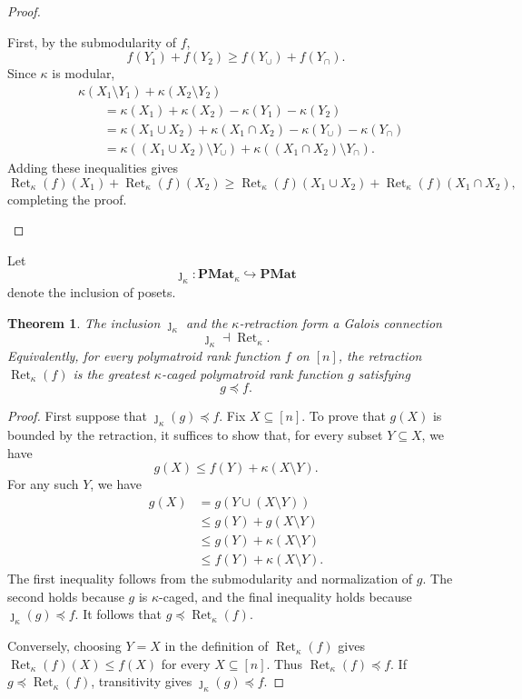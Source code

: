\documentclass[10pt,a4paper]{amsart}
\newtheorem{theorem}{Theorem}[section]
\newcommand{\PMat}{\mathbf{PMat}}      %
\newcommand{\PMatK}{\mathbf{PMat}_\kappa}
\DeclareMathOperator{\Ret}{Ret}                %
\newcommand{\RetK}{\Ret_{\kappa}}              %
\begin{document}
\begin{proof}
\begin{itemize}
        First, by the submodularity of $f$,
        \[
            f(Y_1)+f(Y_2)
            \geq
            f(Y_{\cup})+f(Y_{\cap}).
        \]
        Since $\kappa$ is modular,
        \begin{align*}
            &\kappa(X_1\setminus Y_1)+\kappa(X_2\setminus Y_2)\\
            &\qquad=
            \kappa(X_1)+\kappa(X_2)-\kappa(Y_1)-\kappa(Y_2)\\
            &\qquad=
            \kappa(X_1\cup X_2)+\kappa(X_1\cap X_2)
            -\kappa(Y_\cup)-\kappa(Y_\cap)\\
            &\qquad=
            \kappa((X_1\cup X_2)\setminus Y_\cup)
            +
            \kappa((X_1\cap X_2)\setminus Y_\cap).
        \end{align*}
        Adding these inequalities gives
        \[
            \RetK(f)(X_1)+\RetK(f)(X_2)
            \geq
            \RetK(f)(X_1\cup X_2)+\RetK(f)(X_1\cap X_2),
        \]
        completing the proof.
    \end{itemize}
\end{proof}

Let
\[
    \jmath_\kappa\colon\PMatK\hookrightarrow\PMat
\]
denote the inclusion of posets.

\begin{theorem}\label{thm:rank_retraction_galois}
    The inclusion $\jmath_\kappa$ and the $\kappa$-retraction form a Galois
    connection
    \[
        \jmath_\kappa\dashv\RetK.
    \]
    Equivalently, for every polymatroid rank function $f$ on $[n]$, the
    retraction $\RetK(f)$ is the greatest $\kappa$-caged polymatroid rank
    function $g$ satisfying
    \[
        g\preceq f.
    \]
\end{theorem}

\begin{proof}
    First suppose that $\jmath_\kappa(g)\preceq f$. Fix
    $X\subseteq[n]$. To prove that $g(X)$ is bounded by the retraction, it
    suffices to show that, for every subset $Y\subseteq X$, we have
    \[
        g(X)\leq f(Y)+\kappa(X\setminus Y).
    \]
    For any such $Y$, we have
    \begin{align*}
        g(X)
        &=g(Y\cup(X\setminus Y))\\
        &\leq g(Y)+g(X\setminus Y)\\
        &\leq g(Y)+\kappa(X\setminus Y)\\
        &\leq f(Y)+\kappa(X\setminus Y).
    \end{align*}
    The first inequality follows from the submodularity and normalization
    of $g$. The second holds because $g$ is $\kappa$-caged, and the final
    inequality holds because $\jmath_\kappa(g)\preceq f$. It follows that
    $g\preceq\RetK(f)$.

    Conversely, choosing $Y=X$ in the definition of $\RetK(f)$ gives
    $\RetK(f)(X)\leq f(X)$ for every $X\subseteq[n]$. Thus
    $\RetK(f)\preceq f$. If $g\preceq\RetK(f)$, transitivity gives
    $\jmath_\kappa(g)\preceq f$.
\end{proof}
\end{document}
